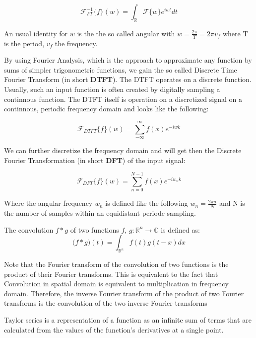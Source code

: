 \begin{equation}
  \mathcal{F}_{FT}^{-1}\{f\}(w) = \int_{\mathds{R}} \mathcal{F}\{w\}e^{iwt} dt
\end{equation}

An usual identity for $w$ is the the so called angular with $w = \frac{2 \pi}{T} = 2 \pi v_f$ where T is the period, $v_f$ the frequency.

By using Fourier Analysis, which is the approach to approximate any function by sums of simpler trigonometric functions, we gain the so called Discrete Time Fourier Transform (in short \textbf{DTFT}). The DTFT operates on a discrete function. Usually, such an input function is often created by digitally sampling a continnous function. The DTFT itself is operation on a discretized signal on a continnous, periodic frequency domain and looks like the following:

\begin{equation}
  \mathcal{F}_{DTFT}\{f\}(w) = \sum_{-\infty}^{\infty} f(x) e^{-iwk}
\end{equation}

We can further discretize the frequency domain and will get then the Discrete Fourier Transformation (in short \textbf{DFT}) of the input signal:

\begin{equation}
  \mathcal{F}_{DFT}\{f\}(w) = \sum_{n=0}^{N-1} f(x) e^{-iw_{n}k}
\end{equation}

Where the angular frequency $w_n$ is defined like the following $w_n = \frac{2\pi n}{N}$ and N is the number of samples within an equidistant periode sampling.

The convolution $f*g$ of two functions $f$, $g$$\colon \mathds{R}^n \to \mathds{C} $ is defined as:  
\begin{equation}
  \mathcal (f*g)(t) = \int_{\mathds{R}^n} f(t)g(t-x) dx
\end{equation}

Note that the Fourier transform of the convolution of two functions is the product of their Fourier transforms. This is equivalent to the fact that Convolution in spatial domain is equivalent to multiplication in frequency domain. Therefore, the inverse Fourier transform of the product of two Fourier transforms is the convolution of the two inverse Fourier transforms

Taylor series is a representation of a function as an infinite sum of terms that are calculated from the values of the function's derivatives at a single point.

